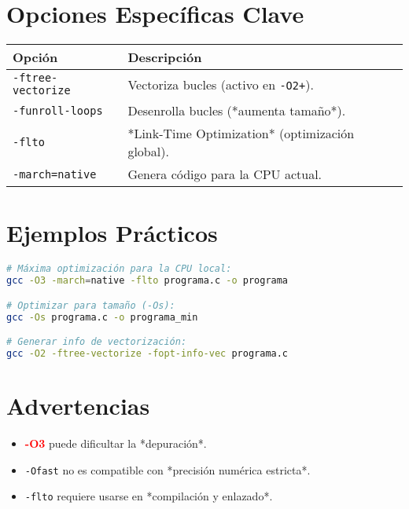 \documentclass{article}
\begin{document}
\section{Opciones Específicas Clave}
\begin{tabular}{|l|l|}
\hline
\textbf{Opción} & \textbf{Descripción} \\ \hline
\texttt{-ftree-vectorize} & Vectoriza bucles (activo en \texttt{-O2+}). \\ \hline
\texttt{-funroll-loops} & Desenrolla bucles (*aumenta tamaño*). \\ \hline
\texttt{-flto} & *Link-Time Optimization* (optimización global). \\ \hline
\texttt{-march=native} & Genera código para la CPU actual. \\ \hline
\end{tabular}

\section{Ejemplos Prácticos}
\begin{lstlisting}[language=bash, frame=single]
# Máxima optimización para la CPU local:
gcc -O3 -march=native -flto programa.c -o programa

# Optimizar para tamaño (-Os):
gcc -Os programa.c -o programa_min

# Generar info de vectorización:
gcc -O2 -ftree-vectorize -fopt-info-vec programa.c
\end{lstlisting}

\section{Advertencias}
\begin{itemize}
    \item \textcolor{red}{\textbf{-O3}} puede dificultar la *depuración*.
    \item \texttt{-Ofast} no es compatible con *precisión numérica estricta*.
    \item \texttt{-flto} requiere usarse en *compilación y enlazado*.
\end{itemize}
\end{document}
